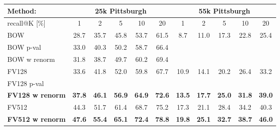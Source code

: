 \begin{table*}[t!]
\begin{centering}
	\begin{tabularx}{0.68\linewidth}{|l|c c c c c|c c c c c|}
		\hline 
		\rowcolor{maroon!50}
		Method: & \multicolumn{5}{c|}{25k Pittsburgh} & \multicolumn{5}{c|}{55k Pittsburgh} \\
		\hline 
		\hline 
		\rowcolor{maroon!50}
		recall@K [$\%$] & 1 & 2 & 5 & 10 & 20 & 1 & 2 & 5 & 10 & 20\\
		\hline
		\rowcolor{maroon!10}
		BOW & 28.7 & 35.7 & 45.8 & 53.7 & 61.5 & 8.7 & 11.0 & 17.3 & 22.8 & 25.4  \\
        \rowcolor{maroon!10}
		BOW p-val  & 33.0  & 40.3  & 50.2 &  58.7 &  66.4  & & & & & \\
        \rowcolor{maroon!10}
		BOW w renorm & 31.8 & 38.7 & 49.7 & 60.2 & 69.4  & & & & & \\
        \hline
		\rowcolor{maroon!10}
		FV128         & 33.6 & 41.8 & 52.0 & 59.8 & 67.7 & 10.9 & 14.1 & 20.2 & 26.4 & 33.2 \\
		\rowcolor{maroon!10}
		FV128 p-val   & \textbf{}  & \textbf{} & \textbf{} & \textbf{} & \textbf{}  &
                                 \textbf{}  &  \textbf{}  &  \textbf{}  &  \textbf{}  &  \textbf{} \\
        \rowcolor{maroon!10}
		\textbf{FV128 w renorm}   & \textbf{37.8}  & \textbf{46.1} & \textbf{56.9} & \textbf{64.9} & \textbf{72.6}  &
                                 \textbf{13.5}  &  \textbf{17.7}  &  \textbf{25.0}  &  \textbf{31.8}  &  \textbf{39.0} \\
        \hline
    \rowcolor{maroon!10}
    FV512         & 44.3 & 51.7 & 61.4 & 68.7 & 75.2 & 17.3 &  21.1 &  28.4 &  34.2 &  40.3 \\
    \rowcolor{maroon!10}
    \rowcolor{maroon!10}
    \textbf{FV512 w renorm}   & \textbf{47.6}  & \textbf{55.4} & \textbf{65.1} & \textbf{72.4} & \textbf{78.8}  &
                             \textbf{19.8} &  \textbf{25.1} &  \textbf{32.7}  & \textbf{38.7} &  \textbf{46.0} \\

\end{tabularx}
\end{centering}
\end{table*}
